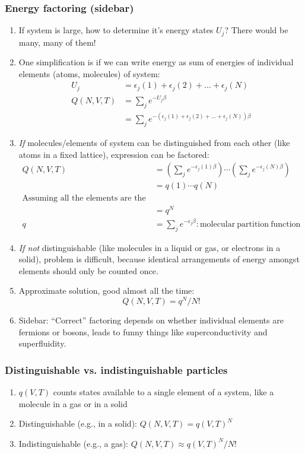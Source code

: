 \documentclass[11pt]{article}
\begin{document}
\subsubsection{Energy factoring (sidebar)}
\label{sec:org527cc73}
\begin{enumerate}
\item If system is large, how to determine it's energy states \(U_j\)?  There would be many, many of them!
\item One simplification is if we can write energy as sum of energies of individual elements (atoms, molecules) of system:
\begin{align}
  U_j&=\epsilon_j(1)+\epsilon_j(2) + ... + \epsilon_j(N) \\
  Q(N,V,T) &= \sum_j e^{-U_j\beta} \\
  &=\sum_je^{-(\epsilon_j(1)+\epsilon_j(2) + ... + \epsilon_j(N))\beta}
\end{align}
\item \emph{If} molecules/elements of system can be distinguished from each
other (like atoms in a fixed lattice), expression can be factored:
   \begin{align}
     Q(N,V,T)&=\left ( \sum_j e^{-\epsilon_j(1)\beta}\right )\cdots \left ( \sum_j
       e^{-\epsilon_j(N)\beta}\right ) \\
   &= q(1)\cdots q(N) \\
   \text{Assuming all the elements are the same:}\\
   &= q^N \\
  q&=\sum_j e^{-\epsilon_j \beta}: \mathrm{molecular\ partition\ function}
\end{align}
\item \emph{If not} distinguishable (like molecules in a liquid or gas, or electrons in a solid), problem is difficult, because identical
arrangements of energy amongst elements should only be counted once.
\item Approximate solution, good almost all the time:
\begin{equation}
  Q(N,V,T)=q^N/N!
\end{equation}
\item Sidebar: ``Correct'' factoring depends on whether individual elements are fermions or bosons, leads to funny things like superconductivity and superfluidity.
\end{enumerate}

\subsubsection{Distinguishable vs. indistinguishable particles}
\label{sec:org606b58e}
\begin{enumerate}
\item \(q(V,T)\) counts states available to a single element of a system, like a molecule in a gas or in a solid
\item Distinguishable (e.g., in a solid): \(Q(N,V,T) = q(V,T)^N\)
\item Indistinguishable (e.g., a gas): \(Q(N,V,T)\approx q(V,T)^N/N!\)
\end{enumerate}
\end{document}
